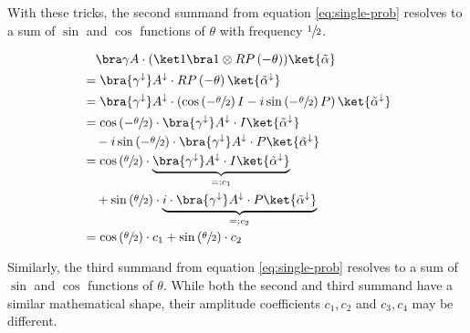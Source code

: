 With these tricks, the second summand from equation \ref{eq:single-prob}
resolves to a sum of $\sin$ and $\cos$ functions of $\theta$ with frequency
$\sfrac12$.

\begin{equation}
    \label{eq:single-prob-simplification1}
    \begin{split}
            &\quad \bra\gamma A \cdot (\ket 1 \bra 1 \otimes RP\left(-\theta\right)) \ket{\tilde\alpha} \\
            &= \bra{\gamma^\downarrow} A^\downarrow \cdot RP\left(-\theta\right) \ket{\tilde\alpha^\downarrow} \\
            &= \bra{\gamma^\downarrow} A^\downarrow \cdot \left(\cos\left(-\sfrac\theta2\right) I - i \sin\left(-\sfrac\theta2\right) P\right) \ket{\tilde\alpha^\downarrow} \\
            &= \cos\left(-\sfrac\theta2\right) \cdot \bra{\gamma^\downarrow} A^\downarrow \cdot I \ket{\tilde\alpha^\downarrow} \\
                &\quad - i \sin\left(-\sfrac\theta2\right) \cdot \bra{\gamma^\downarrow} A^\downarrow \cdot P \ket{\tilde\alpha^\downarrow} \\
            &= \cos\left(\sfrac\theta2\right) \cdot \underbrace{\bra{\gamma^\downarrow} A^\downarrow \cdot I \ket{\tilde\alpha^\downarrow}}_{=: c_1} \\
                &\quad + \sin\left(\sfrac\theta2\right) \cdot \underbrace{i \cdot \bra{\gamma^\downarrow} A^\downarrow \cdot P \ket{\tilde\alpha^\downarrow}}_{=: c_2} \\
            &= \cos\left(\sfrac\theta2\right) \cdot c_1 + \sin\left(\sfrac\theta2\right) \cdot c_2
    \end{split}
\end{equation}

Similarly, the third summand from equation \ref{eq:single-prob} resolves to a
sum of $\sin$ and $\cos$ functions of $\theta$.
While both the second and third summand have a similar mathematical shape, their
amplitude coefficients $c_1, c_2$ and $c_3, c_4$ may be different.

